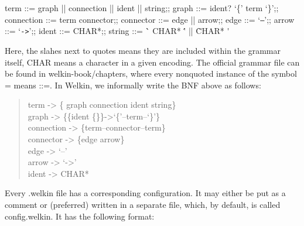 \renewcommand{\bnfexpr}{\textbf}
\begin{bnfgrammar}
	term ::= graph || connection || ident || string;;
	graph ::= ident? `\{' term `\}';;
	connection ::= term connector;;
	connector ::= edge || arrow;;
	edge ::= `\texttt{--}';;
	arrow ::= `\texttt{->}';;
	ident ::= CHAR*;;
	string ::= \`` CHAR* \'' || \` CHAR* \'
\end{bnfgrammar}
Here, the slahes next to quotes means they are included within the grammar itself, CHAR means a character in a given encoding. The official grammar file can be found in welkin-book/chapters, where every nonquoted instance of the symbol = means ::=. In Welkin, we informally write the BNF above as follows:
\begin{quote}{\ttfamily \raggedright \noindent
	term -> \{ graph connection ident string\}\\
	graph -> \{\{ident \{\}\}->`\{'--term--`\}'\}\\
	connection -> \{term--connector--term\}\\
	connector -> \{edge arrow\}\\
	edge -> `--'\\
	arrow -> `->'\\
	ident -> CHAR*\\
}\end{quote}
Every .welkin file has a corresponding configuration. It may either be put as a comment or (preferred) written in a separate file, which, by default, is called config.welkin. It has the following format:
